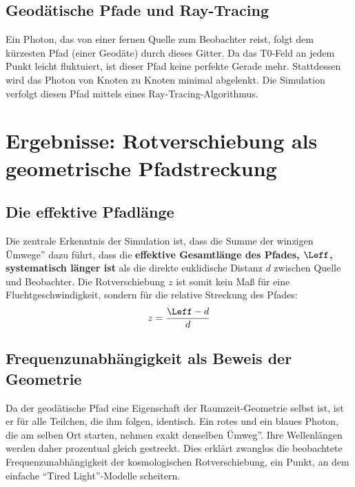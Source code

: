 	\subsection{Geodätische Pfade und Ray-Tracing}
	Ein Photon, das von einer fernen Quelle zum Beobachter reist, folgt dem kürzesten Pfad (einer Geodäte) durch dieses Gitter. Da das T0-Feld an jedem Punkt leicht fluktuiert, ist dieser Pfad keine perfekte Gerade mehr. Stattdessen wird das Photon von Knoten zu Knoten minimal abgelenkt. Die Simulation verfolgt diesen Pfad mittels eines Ray-Tracing-Algorithmus.
	\section{Ergebnisse: Rotverschiebung als geometrische Pfadstreckung}
	\subsection{Die effektive Pfadlänge}
	Die zentrale Erkenntnis der Simulation ist, dass die Summe der winzigen Ümwege'' dazu führt, dass die \textbf{effektive Gesamtlänge des Pfades, $\Leff$, systematisch länger ist} als die direkte euklidische Distanz $d$ zwischen Quelle und Beobachter.
	Die Rotverschiebung $z$ ist somit kein Maß{} für eine Fluchtgeschwindigkeit, sondern für die relative Streckung des Pfades:
	\begin{equation}
		z = \frac{\Leff - d}{d}
	\end{equation}
	\subsection{Frequenzunabhängigkeit als Beweis der Geometrie}
	Da der geodätische Pfad eine Eigenschaft der Raumzeit-Geometrie selbst ist, ist er für alle Teilchen, die ihm folgen, identisch. Ein rotes und ein blaues Photon, die am selben Ort starten, nehmen exakt denselben Ümweg''. Ihre Wellenlängen werden daher prozentual gleich gestreckt. Dies erklärt zwanglos die beobachtete Frequenzunabhängigkeit der kosmologischen Rotverschiebung, ein Punkt, an dem einfache ``Tired Light''-Modelle scheitern.
